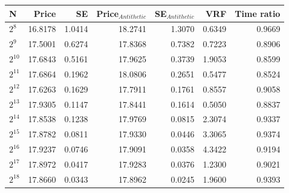 \begin{tabular}{lrrrrrr}
\toprule
N & Price & SE & Price$_{Antithetic}$ & SE$_{Antithetic}$ & VRF & Time ratio \\
\midrule
$2^{8}$ & 16.8178 & 1.0414 & 18.2741 & 1.3070 & 0.6349 & 0.9669 \\
$2^{9}$ & 17.5001 & 0.6274 & 17.8368 & 0.7382 & 0.7223 & 0.8906 \\
$2^{10}$ & 17.6843 & 0.5161 & 17.9625 & 0.3739 & 1.9053 & 0.8599 \\
$2^{11}$ & 17.6864 & 0.1962 & 18.0806 & 0.2651 & 0.5477 & 0.8524 \\
$2^{12}$ & 17.6263 & 0.1629 & 17.7911 & 0.1761 & 0.8557 & 0.9058 \\
$2^{13}$ & 17.9305 & 0.1147 & 17.8441 & 0.1614 & 0.5050 & 0.8837 \\
$2^{14}$ & 17.8538 & 0.1238 & 17.9769 & 0.0815 & 2.3074 & 0.9337 \\
$2^{15}$ & 17.8782 & 0.0811 & 17.9330 & 0.0446 & 3.3065 & 0.9374 \\
$2^{16}$ & 17.9237 & 0.0746 & 17.9091 & 0.0358 & 4.3422 & 0.9194 \\
$2^{17}$ & 17.8972 & 0.0417 & 17.9283 & 0.0376 & 1.2300 & 0.9021 \\
$2^{18}$ & 17.8660 & 0.0343 & 17.8962 & 0.0245 & 1.9600 & 0.9393 \\
\bottomrule
\end{tabular}
